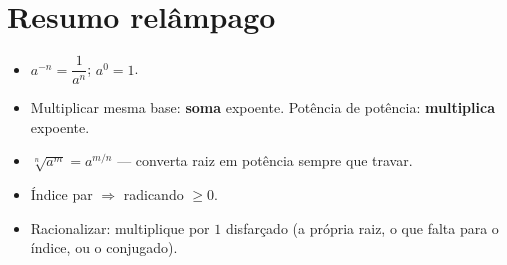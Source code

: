 \documentclass[12pt,a4paper]{article}
\begin{document}
\section*{Resumo relâmpago}
\begin{itemize}[nosep]
  \item $a^{-n} = \dfrac{1}{a^n}$; \quad $a^0=1$.
  \item Multiplicar mesma base: \textbf{soma} expoente. Potência de potência: \textbf{multiplica} expoente.
  \item $\sqrt[n]{a^m} = a^{m/n}$ — converta raiz em potência sempre que travar.
  \item Índice par $\Rightarrow$ radicando $\ge 0$.
  \item Racionalizar: multiplique por $1$ disfarçado (a própria raiz, o que falta para o índice, ou o conjugado).
\end{itemize}
\end{document}
